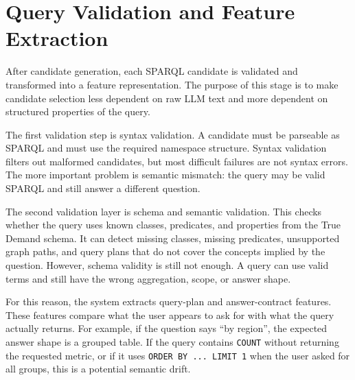 \section{Query Validation and Feature Extraction}
\label{sec:query-validation-feature-extraction}

After candidate generation, each SPARQL candidate is validated and transformed into a feature representation. The purpose of this stage is to make candidate selection less dependent on raw LLM text and more dependent on structured properties of the query.

The first validation step is syntax validation. A candidate must be parseable as SPARQL and must use the required namespace structure. Syntax validation filters out malformed candidates, but most difficult failures are not syntax errors. The more important problem is semantic mismatch: the query may be valid SPARQL and still answer a different question.

The second validation layer is schema and semantic validation. This checks whether the query uses known classes, predicates, and properties from the True Demand schema. It can detect missing classes, missing predicates, unsupported graph paths, and query plans that do not cover the concepts implied by the question. However, schema validity is still not enough. A query can use valid terms and still have the wrong aggregation, scope, or answer shape.

For this reason, the system extracts query-plan and answer-contract features. These features compare what the user appears to ask for with what the query actually returns. For example, if the question says ``by region'', the expected answer shape is a grouped table. If the query contains \texttt{COUNT} without returning the requested metric, or if it uses \texttt{ORDER BY ... LIMIT 1} when the user asked for all groups, this is a potential semantic drift.

